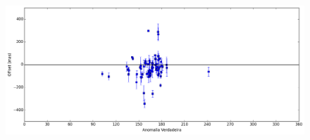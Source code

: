 \documentclass[11pt,a4paper]{report}
\begin{document}
\begin{figure}[h]
\includegraphics[scale=0.45]{Nereida/DEC_anom.png}  
\end{figure}

\end{document}
